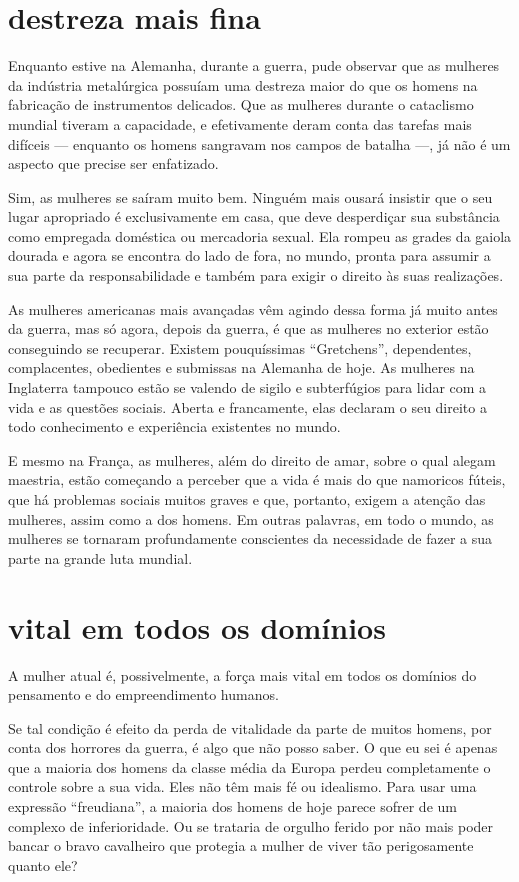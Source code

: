 \section{destreza mais fina}

Enquanto estive na Alemanha, durante a guerra, pude observar que as
mulheres da indústria metalúrgica possuíam uma destreza maior do que os
homens na fabricação de instrumentos delicados. Que as mulheres durante
o cataclismo mundial tiveram a capacidade, e efetivamente
deram conta das tarefas mais difíceis --- enquanto os homens sangravam
nos campos de batalha ---, já não é um aspecto que precise ser
enfatizado.

Sim, as mulheres se saíram muito bem. Ninguém mais ousará
insistir que o seu lugar apropriado é exclusivamente em casa, que deve
desperdiçar sua substância como empregada doméstica ou mercadoria
sexual. Ela rompeu as grades da gaiola dourada e agora se encontra do
lado de fora, no mundo, pronta para assumir a sua parte da
responsabilidade e também para exigir o direito às suas realizações.

As mulheres americanas mais avançadas vêm agindo dessa forma já muito
antes da guerra, mas só agora, depois da guerra, é que as mulheres no
exterior estão conseguindo se recuperar. Existem pouquíssimas
``Gretchens'', dependentes, complacentes, obedientes e submissas na
Alemanha de hoje. As mulheres na Inglaterra tampouco estão se valendo de
sigilo e subterfúgios para lidar com a vida e as questões sociais.
Aberta e francamente, elas declaram o seu direito a todo
conhecimento e experiência existentes no mundo.

E mesmo na França, as mulheres, além do direito de amar, sobre o qual
alegam maestria, estão começando a perceber que a vida é mais do que
namoricos fúteis, que há problemas sociais muitos graves e que,
portanto, exigem a atenção das mulheres, assim como a dos homens. Em
outras palavras, em todo o mundo, as mulheres se tornaram profundamente
conscientes da necessidade de fazer a sua parte na grande luta mundial.

\section{vital em todos os domínios}

A mulher atual é, possivelmente, a força mais vital em todos os domínios
do pensamento e do empreendimento humanos.

Se tal condição é efeito da perda de vitalidade da parte de muitos homens, por
conta dos horrores da guerra, é algo que não posso saber. O que eu sei é
apenas que a maioria dos homens da classe média da Europa perdeu completamente o
controle sobre a sua vida. Eles não têm mais fé ou idealismo. Para usar
uma expressão ``freudiana'', a maioria dos homens de hoje parece sofrer
de um complexo de inferioridade. Ou se trataria de orgulho ferido por
não mais poder bancar o bravo cavalheiro que protegia a mulher de viver
tão perigosamente quanto ele?

